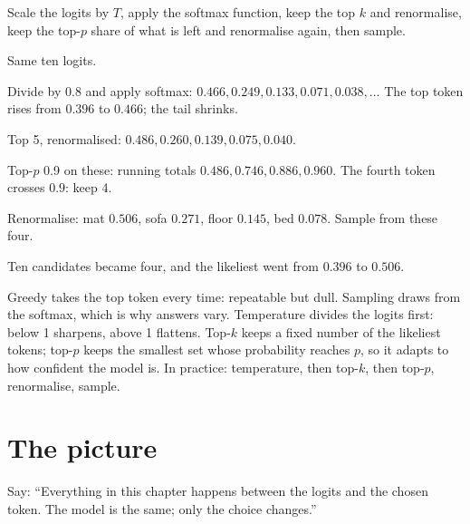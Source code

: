 \begin{result}
Scale the logits by $T$, apply the softmax function, keep the top $k$ and renormalise, keep the top-$p$ share of what is left and renormalise again, then sample.
\end{result}

\begin{example}[$T = 0.8$, $k = 5$, $p = 0.9$]
Same ten logits.
\begin{steps}
  \item Divide by $0.8$ and apply softmax: $0.466, 0.249, 0.133, 0.071, 0.038, \dots$ The top token rises from $0.396$ to $0.466$; the tail shrinks.
  \item Top 5, renormalised: $0.486, 0.260, 0.139, 0.075, 0.040$.
  \item Top-$p$ 0.9 on these: running totals $0.486, 0.746, 0.886, 0.960$. The fourth token crosses $0.9$: keep 4.
  \item Renormalise: mat $0.506$, sofa $0.271$, floor $0.145$, bed $0.078$. Sample from these four.
\end{steps}
Ten candidates became four, and the likeliest went from $0.396$ to $0.506$.
\end{example}

\begin{sayit}
Greedy takes the top token every time: repeatable but dull. Sampling draws from the softmax, which is why answers vary. Temperature divides the logits first: below 1 sharpens, above 1 flattens. Top-$k$ keeps a fixed number of the likeliest tokens; top-$p$ keeps the smallest set whose probability reaches $p$, so it adapts to how confident the model is. In practice: temperature, then top-$k$, then top-$p$, renormalise, sample.
\end{sayit}

\section{The picture}

\begin{sayit}
\begin{pic}
\end{pic}
Say: ``Everything in this chapter happens between the logits and the chosen token. The model is the same; only the choice changes.''
\end{sayit}

